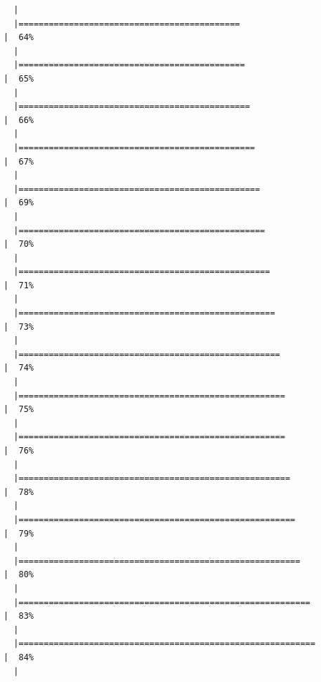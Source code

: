\documentclass[
  letterpaper,
  DIV=11,
  numbers=noendperiod]{scrartcl}
\begin{document}
\begin{verbatim}
  |                                                                            
  |============================================                          |  64%
  |                                                                            
  |=============================================                         |  65%
  |                                                                            
  |==============================================                        |  66%
  |                                                                            
  |===============================================                       |  67%
  |                                                                            
  |================================================                      |  69%
  |                                                                            
  |=================================================                     |  70%
  |                                                                            
  |==================================================                    |  71%
  |                                                                            
  |===================================================                   |  73%
  |                                                                            
  |====================================================                  |  74%
  |                                                                            
  |=====================================================                 |  75%
  |                                                                            
  |=====================================================                 |  76%
  |                                                                            
  |======================================================                |  78%
  |                                                                            
  |=======================================================               |  79%
  |                                                                            
  |========================================================              |  80%
  |                                                                            
  |==========================================================            |  83%
  |                                                                            
  |===========================================================           |  84%
  |                                                                            

\end{verbatim}
\end{document}
